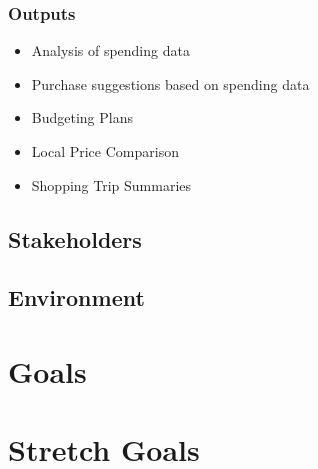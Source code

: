 \documentclass{article}
\begin{document}
\subsubsection{Outputs}
    \begin{itemize}
        \item Analysis of spending data
        \item Purchase suggestions based on spending data
        \item Budgeting Plans
        \item Local Price Comparison
        \item Shopping Trip Summaries
    \end{itemize}

\subsection{Stakeholders}

\subsection{Environment}


\section{Goals}

\section{Stretch Goals}
\end{document}
